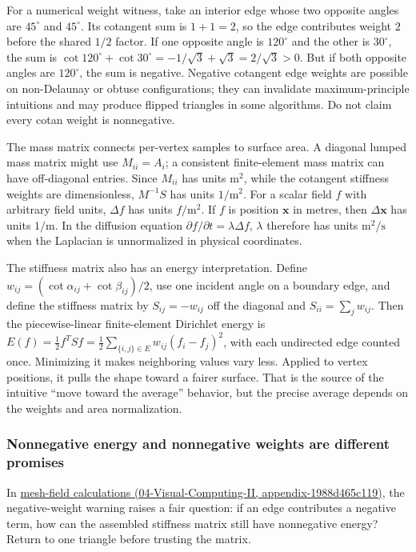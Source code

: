 For a numerical weight witness, take an interior edge whose two opposite angles are \(45^\circ\) and \(45^\circ\). Its cotangent sum is \(1+1=2\), so the edge contributes weight \(2\) before the shared \(1/2\) factor. If one opposite angle is \(120^\circ\) and the other is \(30^\circ\), the sum is \(\cot120^\circ+\cot30^\circ=-1/\sqrt3+\sqrt3=2/\sqrt3>0\). But if both opposite angles are \(120^\circ\), the sum is negative. Negative cotangent edge weights are possible on non-Delaunay or obtuse configurations; they can invalidate maximum-principle intuitions and may produce flipped triangles in some algorithms. Do not claim every cotan weight is nonnegative.

The mass matrix connects per-vertex samples to surface area. A diagonal lumped mass matrix might use \(M_{ii}=A_i\); a consistent finite-element mass matrix can have off-diagonal entries. Since \(M_{ii}\) has units \(\mathrm m^2\), while the cotangent stiffness weights are dimensionless, \(M^{-1}S\) has units \(1/\mathrm m^2\). For a scalar field \(f\) with arbitrary field units, \(\Delta f\) has units \(f/\mathrm m^2\). If \(f\) is position \(\mathbf x\) in metres, then \(\Delta\mathbf x\) has units \(1/\mathrm m\). In the diffusion equation \(\partial f/\partial t=\lambda\Delta f\), \(\lambda\) therefore has units \(\mathrm m^2/\mathrm s\) when the Laplacian is unnormalized in physical coordinates.

The stiffness matrix also has an energy interpretation. Define \(w_{ij}=(\cot\alpha_{ij}+\cot\beta_{ij})/2\), use one incident angle on a boundary edge, and define the stiffness matrix by \(S_{ij}=-w_{ij}\) off the diagonal and \(S_{ii}=\sum_j w_{ij}\). Then the piecewise-linear finite-element Dirichlet energy is \(E(f)=\frac12 f^T S f=\frac12\sum_{\{i,j\}\in E}w_{ij}(f_i-f_j)^2\), with each undirected edge counted once. Minimizing it makes neighboring values vary less. Applied to vertex positions, it pulls the shape toward a fairer surface. That is the source of the intuitive ``move toward the average'' behavior, but the precise average depends on the weights and area normalization.

\subsubsection{Nonnegative energy and nonnegative weights are different promises}\label{03-visual-computing-i-ch002-nonnegative-energy-and-nonnegative-weights-are-different-promises}

In \href{../04-Visual-Computing-II/main.pdf\#nameddest=appendix-1988d465c119}{mesh-field calculations (04-Visual-Computing-II, appendix-1988d465c119)}, the negative-weight warning raises a fair question: if an edge contributes a negative term, how can the assembled stiffness matrix still have nonnegative energy? Return to one triangle before trusting the matrix.

